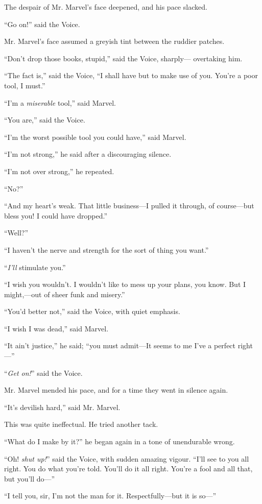 The despair of Mr. Marvel’s face deepened, and his pace slacked.

“Go on!” said the Voice.

Mr. Marvel’s face assumed a greyish tint between the ruddier patches.

“Don’t drop those books, stupid,” said the Voice, sharply—\linebreak{} overtaking him.

“The fact is,” said the Voice, “I shall have but to make use of you. You’re a poor tool, I must.”

“I’m a \emph{miserable} tool,” said Marvel.

“You are,” said the Voice.

“I’m the worst possible tool you could have,” said Marvel.

“I’m not strong,” he said after a discouraging silence.

“I’m not over strong,” he repeated.

“No?”

“And my heart’s weak. That little business—I pulled it through, of course—but bless you! I could have dropped.”

“Well?”

“I haven’t the nerve and strength for the sort of thing you want.”

“\emph{I’ll} stimulate you.”

“I wish you wouldn’t. I wouldn’t like to mess up your plans, you know. But I might,—out of sheer funk and misery.”

“You’d better not,” said the Voice, with quiet emphasis.

“I wish I was dead,” said Marvel.

“It ain’t justice,” he said; “you must admit—It seems to me I’ve a perfect right—”

“\emph{Get on!}” said the Voice.

Mr. Marvel mended his pace, and for a time they went in silence again.

“It’s devilish hard,” said Mr. Marvel.

This was quite ineffectual. He tried another tack.

“What do I make by it?” he began again in a tone of unendurable wrong.

“Oh! \emph{shut up!}” said the Voice, with sudden amazing vigour. “I’ll see to you all right. You do what you’re told. You’ll do it all right. You’re a fool and all that, but you’ll do—”

“I tell you, sir, I’m not the man for it. Respectfully—but it is so—”

